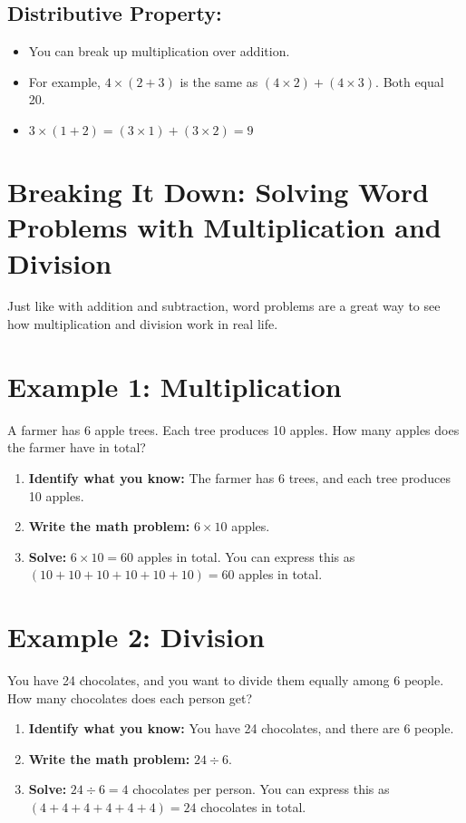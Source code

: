 \subsection{Distributive Property:}
\begin{itemize}
    \item You can break up multiplication over addition.
    \item For example, $4 \times (2 + 3)$ is the same as $(4 \times 2) + (4 \times 3)$. Both equal 20.
    \item $3 \times (1 + 2) = (3 \times 1) + (3 \times 2) = 9$
\end{itemize}

\section{Breaking It Down: Solving Word Problems with Multiplication and Division}
Just like with addition and subtraction, word problems are a great way to see how multiplication and division work in real life.

\section{Example 1: Multiplication}

A farmer has 6 apple trees. Each tree produces 10 apples. How many apples does the farmer have in total?

\begin{enumerate}
    \item \textbf{Identify what you know:} The farmer has 6 trees, and each tree produces 10 apples.
    \item \textbf{Write the math problem:} $6 \times 10$ apples.
    \item \textbf{Solve:} $6 \times 10 = 60$ apples in total. You can express this as $(10 + 10 + 10 + 10 + 10 + 10) = 60$ apples in total.
\end{enumerate}

\section{Example 2: Division}

You have 24 chocolates, and you want to divide them equally among 6 people. How many chocolates does each person get?

\begin{enumerate}
    \item \textbf{Identify what you know:} You have 24 chocolates, and there are 6 people.
    \item \textbf{Write the math problem:} $24 \div 6$.
    \item \textbf{Solve:} $24 \div 6 = 4$ chocolates per person. You can express this as $(4 + 4 + 4 + 4 + 4 + 4) = 24$ chocolates in total.
\end{enumerate}

